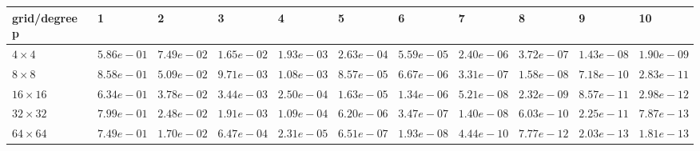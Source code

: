 \begin{tabular}{lllllllllll}
\hline
 grid/degree p   & 1          & 2          & 3          & 4          & 5          & 6          & 7          & 8          & 9          & 10         \\
\hline
 $4 \times 4$    & $5.86e-01$ & $7.49e-02$ & $1.65e-02$ & $1.93e-03$ & $2.63e-04$ & $5.59e-05$ & $2.40e-06$ & $3.72e-07$ & $1.43e-08$ & $1.90e-09$ \\
 $8 \times 8$    & $8.58e-01$ & $5.09e-02$ & $9.71e-03$ & $1.08e-03$ & $8.57e-05$ & $6.67e-06$ & $3.31e-07$ & $1.58e-08$ & $7.18e-10$ & $2.83e-11$ \\
 $16 \times 16$  & $6.34e-01$ & $3.78e-02$ & $3.44e-03$ & $2.50e-04$ & $1.63e-05$ & $1.34e-06$ & $5.21e-08$ & $2.32e-09$ & $8.57e-11$ & $2.98e-12$ \\
 $32 \times 32$  & $7.99e-01$ & $2.48e-02$ & $1.91e-03$ & $1.09e-04$ & $6.20e-06$ & $3.47e-07$ & $1.40e-08$ & $6.03e-10$ & $2.25e-11$ & $7.87e-13$ \\
 $64 \times 64$  & $7.49e-01$ & $1.70e-02$ & $6.47e-04$ & $2.31e-05$ & $6.51e-07$ & $1.93e-08$ & $4.44e-10$ & $7.77e-12$ & $2.03e-13$ & $1.81e-13$ \\
\hline
\end{tabular}